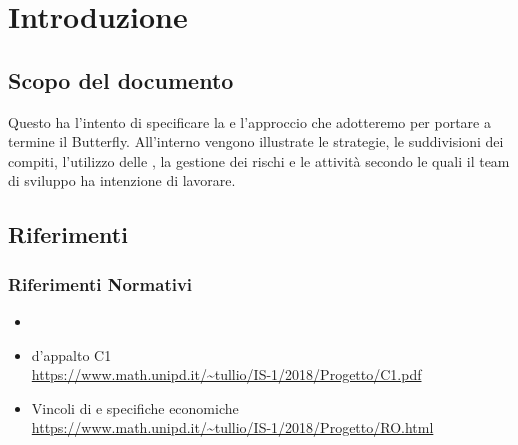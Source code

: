 \newpage
\section{Introduzione} \label{Introduzione}
	
	

	\subsection{Scopo del documento}
	Questo  ha l'intento di specificare la  e l'approccio che adotteremo per portare a termine il  Butterfly.
	All'interno vengono illustrate le strategie, le suddivisioni dei compiti, l'utilizzo delle , la gestione dei rischi e le attività secondo le quali
	il team di sviluppo ha intenzione di lavorare.

    

	\subsection{Riferimenti}
		\subsubsection{Riferimenti Normativi}\label{rifnorma}
			\begin{itemize}
				\item \NdPd
				\item {} d'appalto C1\\
				\url{https://www.math.unipd.it/~tullio/IS-1/2018/Progetto/C1.pdf}
				\item Vincoli di  e specifiche economiche\\
				\url{https://www.math.unipd.it/~tullio/IS-1/2018/Progetto/RO.html}
			\end{itemize}

